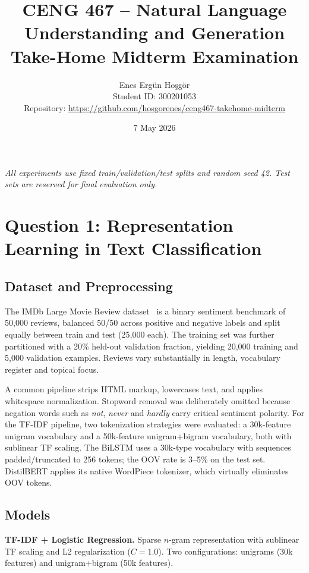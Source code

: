 \documentclass[11pt,a4paper]{article}
\title{\textbf{CENG 467 -- Natural Language Understanding and Generation}\\[0.4em]
\Large Take-Home Midterm Examination}
\author{Enes Ergün Ho{\c s}gör\\Student ID: 300201053\\\small Repository: \url{https://github.com/hosgorenes/ceng467-takehome-midterm}}
\date{7 May 2026}
\begin{document}
\maketitle
\vspace{-0.4em}
\noindent\textit{All experiments use fixed train/validation/test splits and random seed 42. Test sets are reserved for final evaluation only.}
\vspace{0.4em}
\tableofcontents
\newpage

\section{Question 1: Representation Learning in Text Classification}

\subsection{Dataset and Preprocessing}
The IMDb Large Movie Review dataset~\cite{maas2011learning} is a binary sentiment benchmark of 50{,}000 reviews, balanced 50/50 across positive and negative labels and split equally between train and test (25{,}000 each). The training set was further partitioned with a 20\% held-out validation fraction, yielding 20{,}000 training and 5{,}000 validation examples. Reviews vary substantially in length, vocabulary register and topical focus.

A common pipeline strips HTML markup, lowercases text, and applies whitespace normalization. Stopword removal was deliberately omitted because negation words such as \emph{not}, \emph{never} and \emph{hardly} carry critical sentiment polarity. For the TF-IDF pipeline, two tokenization strategies were evaluated: a 30k-feature unigram vocabulary and a 50k-feature unigram+bigram vocabulary, both with sublinear TF scaling. The BiLSTM uses a 30k-type vocabulary with sequences padded/truncated to 256 tokens; the OOV rate is 3--5\% on the test set. DistilBERT applies its native WordPiece tokenizer, which virtually eliminates OOV tokens.

\subsection{Models}
\textbf{TF-IDF + Logistic Regression.} Sparse $n$-gram representation with sublinear TF scaling and L2 regularization ($C{=}1.0$). Two configurations: unigrams (30k features) and unigram+bigram (50k features).
\end{document}
